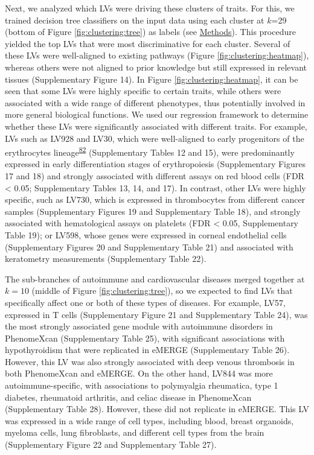 \documentclass[
  a4paper,
]{article}
\begin{document}
Next, we analyzed which LVs were driving these clusters of traits.
For this, we trained decision tree classifiers on the input data using each cluster at \(k\)=29 (bottom of Figure \ref{fig:clustering:tree}) as labels (see \protect\hyperlink{sec:methods:clustering}{Methods}).
This procedure yielded the top LVs that were most discriminative for each cluster.
Several of these LVs were well-aligned to existing pathways (Figure \ref{fig:clustering:heatmap}), whereas others were not aligned to prior knowledge but still expressed in relevant tissues (Supplementary Figure 14).
In Figure \ref{fig:clustering:heatmap}, it can be seen that some LVs were highly specific to certain traits, while others were associated with a wide range of different phenotypes, thus potentially involved in more general biological functions.
We used our regression framework to determine whether these LVs were significantly associated with different traits.
For example, LVs such as LV928 and LV30, which were well-aligned to early progenitors of the erythrocytes lineage\textsuperscript{\protect\hyperlink{ref-Zk82GvJV}{82}} (Supplementary Tables 12 and 15), were predominantly expressed in early differentiation stages of erythropoiesis (Supplementary Figures 17 and 18) and strongly associated with different assays on red blood cells (FDR \textless{} 0.05; Supplementary Tables 13, 14, and 17).
In contrast, other LVs were highly specific, such as LV730, which is expressed in thrombocytes from different cancer samples (Supplementary Figures 19 and Supplementary Table 18), and strongly associated with hematological assays on platelets (FDR \textless{} 0.05, Supplementary Table 19);
or LV598, whose genes were expressed in corneal endothelial cells (Supplementary Figures 20 and Supplementary Table 21) and associated with keratometry measurements (Supplementary Table 22).

The sub-branches of autoimmune and cardiovascular diseases merged together at \(k=10\) (middle of Figure \ref{fig:clustering:tree}), so we expected to find LVs that specifically affect one or both of these types of diseases.
For example, LV57, expressed in T cells (Supplementary Figure 21 and Supplementary Table 24), was the most strongly associated gene module with autoimmune disorders in PhenomeXcan (Supplementary Table 25), with significant associations with hypothyroidism that were replicated in eMERGE (Supplementary Table 26).
However, this LV was also strongly associated with deep venous thrombosis in both PhenomeXcan and eMERGE.
On the other hand, LV844 was more autoimmune-specific, with associations to polymyalgia rheumatica, type 1 diabetes, rheumatoid arthritis, and celiac disease in PhenomeXcan (Supplementary Table 28).
However, these did not replicate in eMERGE.
This LV was expressed in a wide range of cell types, including blood, breast organoids, myeloma cells, lung fibroblasts, and different cell types from the brain (Supplementary Figure 22 and Supplementary Table 27).
\end{document}
